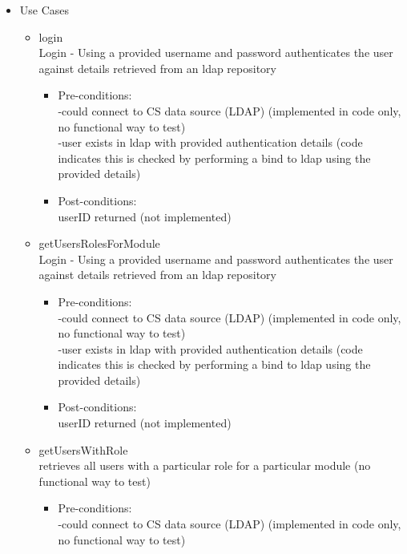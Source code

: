 \begin {itemize}
\item Use Cases
\begin {itemize}
\item {login}\\
Login - Using a provided username and password authenticates the user against details retrieved from an ldap repository
\begin {itemize}
\item Pre-conditions:\\
-could connect to CS data source (LDAP) (implemented in code only, no functional way to test)\\
        -user exists in ldap with provided authentication details (code indicates this is checked by performing a bind to ldap using the provided details)\\
\item Post-conditions:\\
userID returned (not implemented)  
\end {itemize}
\end {itemize}

\begin {itemize}
\item {getUsersRolesForModule}\\
Login - Using a provided username and password authenticates the user against details retrieved from an ldap repository\\
\begin {itemize}
\item Pre-conditions:\\
-could connect to CS data source (LDAP) (implemented in code only, no functional way to test)\\
        -user exists in ldap with provided authentication details (code indicates this is checked by performing a bind to ldap using the provided details)\\
\item Post-conditions:\\
userID returned (not implemented)  
\end {itemize}
\end {itemize}

\begin {itemize}
\item {getUsersWithRole}\\
retrieves all users with a particular role for a particular module (no functional way to test)
\begin {itemize}
\item Pre-conditions:\\
-could connect to CS data source (LDAP) (implemented in code only, no functional way to test)\\  
\end {itemize}
\end {itemize}


\end{itemize}
